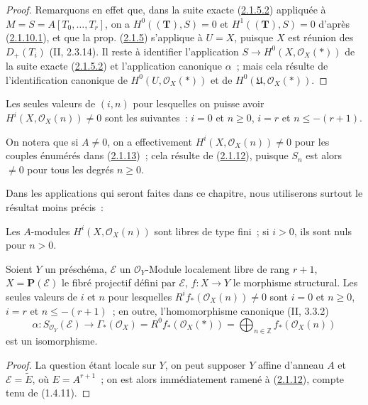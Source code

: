 \begin{proof}
Remarquons en effet que, dans la suite exacte
(\hyperref[III.2.1.5.2-fr]{2.1.5.2}) appliquée à
$M=S=A[T_0,\ldots,T_r]$, on a
$H^0((\mathbf T),S)=0$ et $H^1((\mathbf T),S)=0$ d'après
(\hyperref[III.2.1.10.1-fr]{2.1.10.1}), et que la prop.
(\hyperref[III.2.1.5-fr]{2.1.5}) s'applique à $U=X$, puisque $X$ est
réunion des $D_+(T_i)$ (II, 2.3.14). Il reste à identifier l'application
$S\to H^0(X,\mathcal O_X(*))$ de la suite exacte
(\hyperref[III.2.1.5.2-fr]{2.1.5.2}) et l'application canonique $\alpha$~;
mais cela résulte de l'identification canonique de
$H^0(U,\mathcal O_X(*))$ et de $H^0(\mathfrak U,\mathcal O_X(*))$.
\end{proof}

\begin{corollary}[2.1.13]
\label{III.2.1.13-fr}
Les seules valeurs de $(i,n)$ pour lesquelles on puisse avoir
$H^i(X,\mathcal O_X(n))\neq0$ sont les suivantes~:
$i=0$ et $n\geq0$, $i=r$ et $n\leq-(r+1)$.
\end{corollary}

On notera que si $A\neq0$, on a effectivement
$H^i(X,\mathcal O_X(n))\neq0$ pour les couples énumérés dans
(\hyperref[III.2.1.13-fr]{2.1.13})~; cela résulte de
(\hyperref[III.2.1.12-fr]{2.1.12}), puisque $S_n$ est alors $\neq0$ pour
tous les degrés $n\geq0$.

Dans les applications qui seront faites dans ce chapitre, nous utiliserons
surtout le résultat moins précis~:

\begin{corollary}[2.1.14]
\label{III.2.1.14-fr}
Les $A$-modules $H^i(X,\mathcal O_X(n))$ sont libres de type fini~; si
$i>0$, ils sont nuls pour $n>0$.
\end{corollary}

\begin{proposition}[2.1.15]
\label{III.2.1.15-fr}
Soient $Y$ un préschéma, $\mathcal E$ un $\mathcal O_Y$-Module localement
libre de rang $r+1$, $X=\mathbf P(\mathcal E)$ le fibré projectif défini
par $\mathcal E$, $f:X\to Y$ le morphisme structural. Les seules valeurs de
$i$ et $n$ pour lesquelles $R^if_*(\mathcal O_X(n))\neq0$ sont
$i=0$ et $n\geq0$, $i=r$ et $n\leq-(r+1)$~; en outre, l'homomorphisme
canonique (II, 3.3.2)
\[
\alpha:S_{\mathcal O_Y}(\mathcal E)
\longrightarrow\Gamma_*(\mathcal O_X)
=R^0f_*(\mathcal O_X(*))
=\bigoplus_{n\in\mathbb Z}f_*(\mathcal O_X(n))
\]
est un isomorphisme.
\end{proposition}

\begin{proof}
La question étant locale sur $Y$, on peut supposer $Y$ affine d'anneau
$A$ et $\mathcal E=\widetilde E$, où $E=A^{r+1}$~; on est alors
immédiatement ramené à (\hyperref[III.2.1.12-fr]{2.1.12}), compte tenu de
(1.4.11).
\end{proof}

